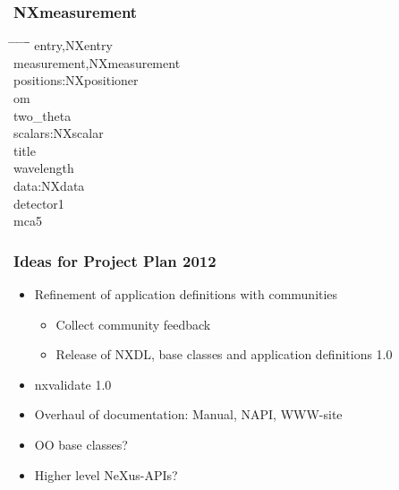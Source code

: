 \documentclass{beamer}
\begin{document}
\begin{frame} \frametitle{NXmeasurement}
\begin{tabbing}
\hspace*{1cm} \= \hspace*{1cm} \= \hspace*{1cm} \= \hspace*{1cm} \= \hspace*{1cm} \= \hspace*{1cm}\= \kill
\>entry,NXentry\\
\> \>measurement,NXmeasurement\\
\> \> \>positions:NXpositioner\\
\> \> \> \>om \\
\> \> \> \>two\_theta\\
\> \> \>scalars:NXscalar\\
\> \> \> \>title\\
\> \> \> \>wavelength\\
\> \> \>data:NXdata\\
\> \> \> \>detector1\\
\> \> \> \>mca5\\
\end{tabbing}
\end{frame}


\begin{frame} \frametitle{Ideas for Project Plan 2012}
\begin{itemize}
\item Refinement of application definitions with communities
\begin{itemize}
\item Collect community feedback
\item Release of NXDL, base classes and application definitions 1.0 
\end{itemize}
\item nxvalidate 1.0
\item Overhaul of documentation: Manual, NAPI, WWW-site
\item OO base classes?
\item Higher level NeXus-APIs?
\end{itemize}
\end{frame}
\end{document}
